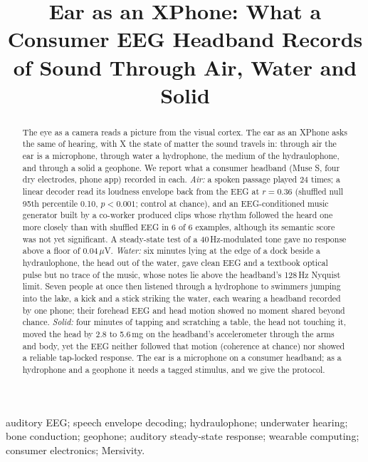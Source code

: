 \documentclass[conference]{IEEEtran}
\begin{document}
\title{Ear as an XPhone: What a Consumer EEG Headband Records of Sound Through Air, Water and Solid}

\author{
}

\maketitle

\begin{abstract}
The eye as a camera reads a picture from the visual cortex. The ear as an XPhone asks the same of hearing, with X the state of matter the sound travels in: through air the ear is a microphone, through water a hydrophone, the medium of the hydraulophone, and through a solid a geophone. We report what a consumer headband (Muse S, four dry electrodes, phone app) recorded in each. \emph{Air:} a spoken passage played 24 times; a linear decoder read its loudness envelope back from the EEG at $r = 0.36$ (shuffled null 95th percentile 0.10, $p < 0.001$; control at chance), and an EEG-conditioned music generator built by a co-worker produced clips whose rhythm followed the heard one more closely than with shuffled EEG in 6 of 6 examples, although its semantic score was not yet significant. A steady-state test of a 40\,Hz-modulated tone gave no response above a floor of 0.04\,$\mu$V. \emph{Water:} six minutes lying at the edge of a dock beside a hydraulophone, the head out of the water, gave clean EEG and a textbook optical pulse but no trace of the music, whose notes lie above the headband's 128\,Hz Nyquist limit. Seven people at once then listened through a hydrophone to swimmers jumping into the lake, a kick and a stick striking the water, each wearing a headband recorded by one phone; their forehead EEG and head motion showed no moment shared beyond chance. \emph{Solid:} four minutes of tapping and scratching a table, the head not touching it, moved the head by 2.8 to 5.6\,mg on the headband's accelerometer through the arms and body, yet the EEG neither followed that motion (coherence at chance) nor showed a reliable tap-locked response. The ear is a microphone on a consumer headband; as a hydrophone and a geophone it needs a tagged stimulus, and we give the protocol.
\end{abstract}

\begin{IEEEkeywords}
auditory EEG; speech envelope decoding; hydraulophone; underwater hearing; bone conduction; geophone; auditory steady-state response; wearable computing; consumer electronics; Mersivity.
\end{IEEEkeywords}
\end{document}
